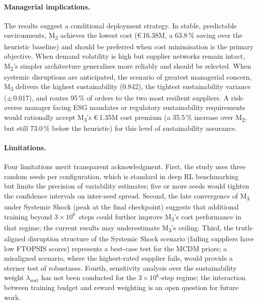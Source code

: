 \documentclass[preprint,12pt]{elsarticle}
\begin{document}
\paragraph{Managerial implications.}
The results suggest a conditional deployment strategy.
In stable, predictable environments, M\textsubscript{3} achieves the lowest cost (\euro\,16.38M, a 63.8\,\% saving over the heuristic baseline) and should be preferred when cost minimisation is the primary objective.
When demand volatility is high but supplier networks remain intact, M\textsubscript{2}'s simpler architecture generalises more reliably and should be selected.
When systemic disruptions are anticipated, the scenario of greatest managerial concern, M\textsubscript{3} delivers the highest sustainability (0.842), the tightest sustainability variance ($\pm$\,0.017), and routes 95\,\% of orders to the two most resilient suppliers.
A risk-averse manager facing ESG mandates or regulatory sustainability requirements would rationally accept M\textsubscript{3}'s \euro\,1.35M cost premium (a 35.5\,\% increase over M\textsubscript{2}, but still 73.0\,\% below the heuristic) for this level of sustainability assurance.

\paragraph{Limitations.}
Four limitations merit transparent acknowledgment.
First, the study uses three random seeds per configuration, which is standard in deep RL benchmarking~\citep{Schulman_etal_2017} but limits the precision of variability estimates; five or more seeds would tighten the confidence intervals on inter-seed spread.
Second, the late convergence of M\textsubscript{3} under Systemic Shock (peak at the final checkpoint) suggests that additional training beyond $3\!\times\!10^{6}$~steps could further improve M\textsubscript{3}'s cost performance in that regime; the current results may underestimate M\textsubscript{3}'s ceiling.
Third, the truth-aligned disruption structure of the Systemic Shock scenario (failing suppliers have low FTOPSIS scores) represents a best-case test for the MCDM priors; a misaligned scenario, where the highest-rated supplier fails, would provide a sterner test of robustness.
Fourth, sensitivity analysis over the sustainability weight $\lambda_{\text{sust}}$ has not been conducted for the $3\!\times\!10^{6}$-step regime; the interaction between training budget and reward weighting is an open question for future work.

\end{document}
